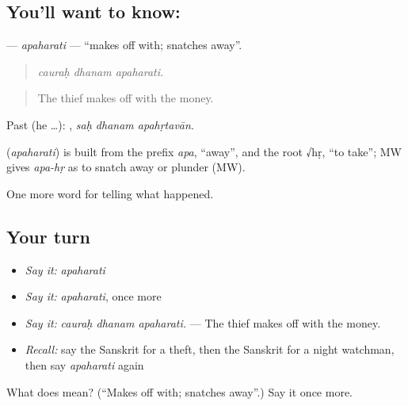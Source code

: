 \subsection*{You'll want to know: }
\textbf{} — \emph{apaharati} — \textquotedblleft{}makes off with; snatches away\textquotedblright{}.

\begin{quote}
  
\end{quote}

\begin{quote}
\emph{cauraḥ dhanam apaharati.}
\end{quote}

\begin{quote}
The thief makes off with the money.
\end{quote}

Past (he …):   , \emph{saḥ dhanam apahṛtavān}.

\begin{cousinweb}
\textbf{} (\emph{apaharati}) is built from the prefix \emph{apa}, \textquotedblleft{}away\textquotedblright{}, and the root √hṛ, \textquotedblleft{}to take\textquotedblright{}; MW gives \emph{apa-hṛ} as to snatch away or plunder (MW).
\end{cousinweb}

\begin{grammarlens}[title={What you've built}]
One more word for telling what happened.
\end{grammarlens}

\subsection*{Your turn}
\begin{itemize}
\raggedright
  \item \emph{Say it:} \emph{apaharati}
  \item \emph{Say it:} \emph{apaharati}, once more
  \item \emph{Say it:} \emph{cauraḥ dhanam apaharati.} — The thief makes off with the money.
  \item \emph{Recall:} say the Sanskrit for a theft, then the Sanskrit for a night watchman, then say \emph{apaharati} again
\end{itemize}

\begin{tcolorbox}[breakable,colback=teal!4,colframe=teal!35!black,title={Before you move on}]
What does  mean? (\textquotedblleft{}Makes off with; snatches away\textquotedblright{}.) Say it once more.
\end{tcolorbox}
